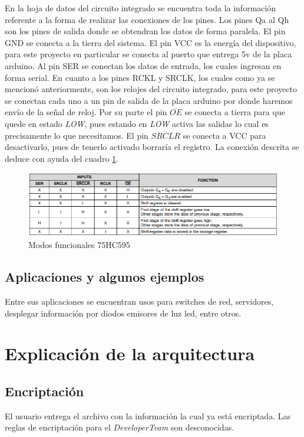 \documentclass{article}
\begin{document}
En la hoja de datos del circuito integrado se encuentra toda la información referente a la forma de realizar las conexiones de los pines.
Los pines Qa al Qh son los pines de salida donde se obtendran los datos de forma paralela. El pin GND se conecta a la tierra del sistema. El pin VCC es la energía del dispositivo, para este proyecto en particular se conecta al puerto que entrega 5v de la placa arduino. Al pin SER se conectan los datos de entrada, los cuales ingresan en forma serial. En cuanto a los pines RCKL y SRCLK, los cuales como ya se mencionó anteriormente, son los relojes del circuito integrado, para este proyecto se conectan cada uno a un pin de salida de la placa arduino por donde haremos envío de la señal de reloj. Por su parte el pin $\overline{OE}$ se conecta a tierra para que quede en estado \textit{LOW}, pues estando en \textit{LOW} activa las salidas lo cual es precisamente lo que necesitamos. El pin $\overline{SRCLR}$ se conecta a VCC para desactivarlo, pues de tenerlo activado borraría el registro. 
La conexión descrita se deduce con ayuda del cuadro \ref{fig:Modos}.


    \begin{figure}[h]
    \includegraphics[width=12cm]{imagen/Modos.png}
    \centering
    \caption{Modos funcionales 75HC595\footnotemark}
    \label{fig:Modos}
    \end{figure}
    

    
    
\subsection{Aplicaciones y algunos ejemplos}
Entre sus aplicaciones se encuentran usos para switches de red, servidores, desplegar información por diodos emisores de luz led, entre otros.


\section{Explicación de la arquitectura} 
\subsection{Encriptación}
El usuario entrega el archivo con la información la cual ya está encriptada. Las reglas de encriptación para el \textit{DeveloperTeam} son desconocidas.
\end{document}
